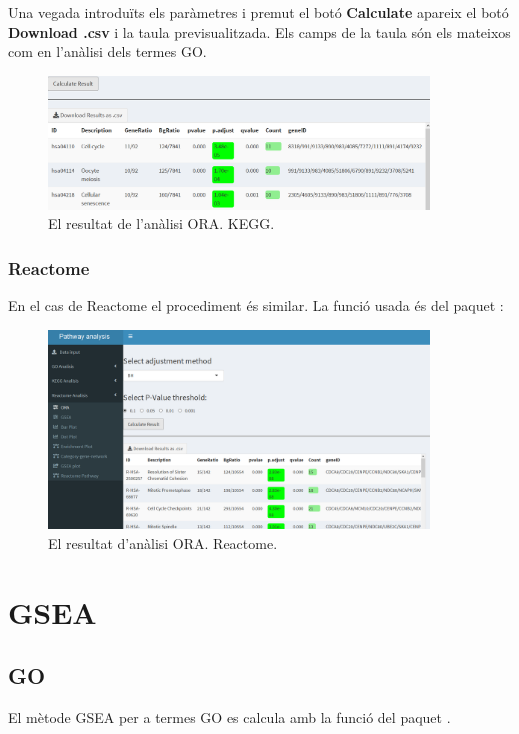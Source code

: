 Una vegada introduïts els paràmetres i premut el botó \textbf{Calculate} apareix el botó \textbf{Download .csv} i la taula previsualitzada. Els camps de la taula són els mateixos com en l'anàlisi dels termes GO.
\begin{figure}[H]
\centering
\includegraphics[width=0.9\textwidth]{figures/App_F9_Items_KEGG_ORA_Table.png} 
\caption{El resultat de l'anàlisi ORA. KEGG.}
\end{figure}

\subsubsection{Reactome}
En el cas de Reactome el procediment és similar. La funció usada és  del paquet :


\begin{figure}[H]
\centering
\includegraphics[width=0.9\textwidth]{figures/App_F10_Items_Reactome_ORA.png} 
\caption{El resultat d'anàlisi ORA. Reactome.}
\end{figure}

\section{GSEA}
\subsection{GO}
El mètode GSEA per a termes GO es calcula amb la funció  del paquet . 


